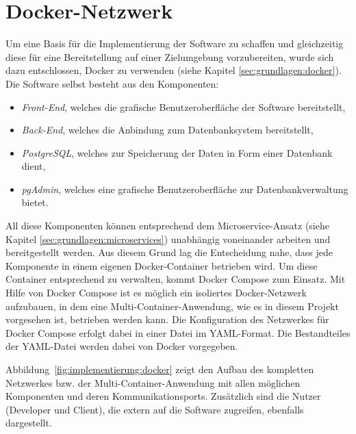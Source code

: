 \section{Docker-Netzwerk}

Um eine Basis für die Implementierung der Software zu schaffen und gleichzeitig diese für eine Bereitstellung auf einer Zielumgebung vorzubereiten, wurde sich dazu entschlossen, Docker zu verwenden (siehe Kapitel \ref{sec:grundlagen:docker}).
Die Software selbst besteht aus den Komponenten:
\begin{itemize}
	\item \emph{Front-End}, welches die grafische Benutzeroberfläche der Software bereitstellt,
	\item \emph{Back-End}, welches die Anbindung zum Datenbanksystem bereitstellt,
	\item \emph{PostgreSQL}, welches zur Speicherung der Daten in Form einer Datenbank dient,
	\item \emph{pgAdmin}, welches eine grafische Benutzeroberfläche zur Datenbankverwaltung bietet.
\end{itemize}

All diese Komponenten können entsprechend dem Microservice-Ansatz (siehe Kapitel \ref{sec:grundlagen:microservices}) unabhängig voneinander arbeiten und bereitgestellt werden.
Aus diesem Grund lag die Entscheidung nahe, dass jede Komponente in einem eigenen Docker-Container betrieben wird.
Um diese Container entsprechend zu verwalten, kommt Docker Compose zum Einsatz.
Mit Hilfe von Docker Compose ist es möglich ein isoliertes Docker-Netzwerk aufzubauen, in dem eine Multi-Container-Anwendung, wie es in diesem Projekt vorgesehen ist, betrieben werden kann.
Die Konfiguration des Netzwerkes für Docker Compose erfolgt dabei in einer Datei im \acs{YAML}-Format.
Die Bestandteiles der \acs{YAML}-Datei werden dabei von Docker vorgegeben.

Abbildung~\vref{fig:implementierung:docker} zeigt den Aufbau des kompletten Netzwerkes bzw. der Multi-Container-Anwendung mit allen möglichen Komponenten und deren Kommunikationsports. 
Zusätzlich sind die Nutzer (Developer und Client), die extern auf die Software zugreifen, ebenfalls dargestellt.

